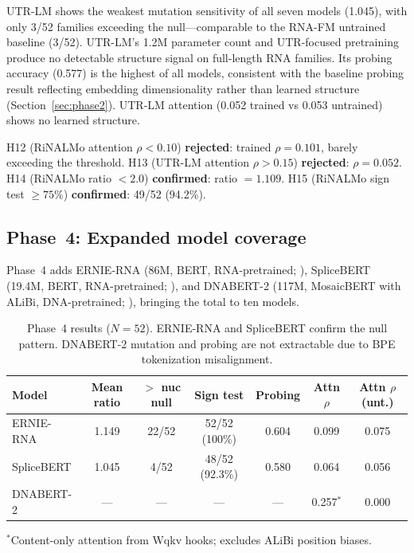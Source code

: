 \documentclass[11pt]{article}
\begin{document}
UTR-LM shows the weakest mutation sensitivity of all seven models
(1.045), with only 3/52 families exceeding the null---comparable to
the RNA-FM untrained baseline (3/52).  UTR-LM's 1.2M parameter count
and UTR-focused pretraining produce no detectable structure signal on
full-length RNA families.  Its probing accuracy (0.577) is the highest
of all models, consistent with the baseline probing result reflecting
embedding dimensionality rather than learned structure
(Section~\ref{sec:phase2}).  UTR-LM attention (0.052 trained vs 0.053
untrained) shows no learned structure.

H12 (RiNALMo attention $\rho < 0.10$) \textbf{rejected}: trained
$\rho = 0.101$, barely exceeding the threshold.  H13 (UTR-LM
attention $\rho > 0.15$) \textbf{rejected}: $\rho = 0.052$.  H14
(RiNALMo ratio $< 2.0$) \textbf{confirmed}: ratio $= 1.109$.  H15
(RiNALMo sign test $\geq 75\%$) \textbf{confirmed}: 49/52 (94.2\%).

\subsection{Phase~4: Expanded model coverage}
\label{sec:phase4}

Phase~4 adds ERNIE-RNA (86M, BERT, RNA-pretrained;
\citealp{wang2024ernierna}), SpliceBERT (19.4M, BERT,
RNA-pretrained; \citealp{chen2024splicebert}), and DNABERT-2 (117M,
MosaicBERT with ALiBi, DNA-pretrained; \citealp{zhou2024dnabert2}),
bringing the total to ten models.

\begin{table}[t]
\centering
\caption{Phase~4 results ($N = 52$).  ERNIE-RNA and SpliceBERT
  confirm the null pattern.  DNABERT-2 mutation and probing are not
  extractable due to BPE tokenization misalignment.}
\label{tab:phase4}
\begin{tabular}{@{}lcccccc@{}}
\toprule
\textbf{Model} & \textbf{Mean ratio} & \textbf{$>$ nuc null} &
  \textbf{Sign test} & \textbf{Probing} &
  \textbf{Attn $\rho$} & \textbf{Attn $\rho$ (unt.)} \\
\midrule
ERNIE-RNA  & 1.149 & 22/52 & 52/52 (100\%) & 0.604 & 0.099 & 0.075 \\
SpliceBERT & 1.045 & 4/52  & 48/52 (92.3\%) & 0.580 & 0.064 & 0.056 \\
DNABERT-2  & ---   & ---   & ---            & ---   & 0.257$^*$ & 0.000 \\
\bottomrule
\end{tabular}
\medskip

\small $^*$Content-only attention from Wqkv hooks; excludes ALiBi
position biases.
\end{table}
\end{document}
